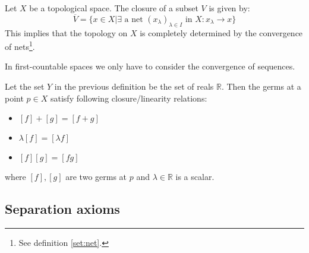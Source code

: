 	\begin{property}
	    	Let $X$ be a topological space. The closure of a subset $V$ is given by:
	    	\begin{equation}
	    		\label{topology:closure}
	    		\overline{V} = \{x\in X| \exists \text{ a net } (x_\lambda)_{\lambda\in I} \text{ in } X:x_\lambda\rightarrow x\}
	    	\end{equation}
	    	This implies that the topology on $X$ is completely determined by the convergence of nets\footnote{See definition \ref{set:net}.}.
	\end{property}
	\begin{result}
	    	In first-countable spaces we only have to consider the convergence of sequences.
	\end{result}
    
	
	\begin{property}
		Let the set $Y$ in the previous definition be the set of reals $\mathbb{R}$. Then the germs at a point $p\in X$ satisfy following closure/linearity relations:
		\begin{itemize}
			\item $[f] + [g] = [f+g]$
			\item $\lambda[f] = [\lambda f]$
			\item $[f][g] = [fg]$
		\end{itemize}
		where $[f], [g]$ are two germs at $p$ and $\lambda\in\mathbb{R}$ is a scalar.
	\end{property}
   
\subsection{Separation axioms}

	
